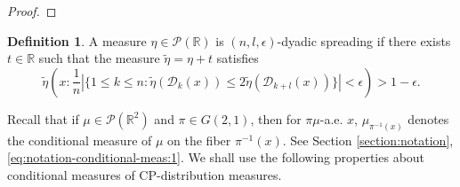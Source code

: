 \documentclass[a4paper,11pt]{amsart}
\theoremstyle{definition}
\newtheorem{definition}[theorem]{Definition}
\numberwithin{equation}{section}
\def\D{\mathcal{D}}
\def\cP{\mathcal P}
\def\R{\mathbb R}
\begin{document}
\begin{proof}
\end{proof}



\begin{definition}\label{definition:spreading measures}
A measure $\eta\in \cP(\R)$ is $(n,l,\epsilon)$-dyadic spreading if  there exists $t\in \R$ such that the measure $\tilde{\eta}=\eta+t$ satisfies
\[
\tilde{\eta}\left(x: \frac{1}{n}| \{1\le k\le n: \tilde{\eta}(\D_k(x))\le 2 \tilde{\eta}(\D_{k+l}(x))\} |<\epsilon\right) >1-\epsilon.
\]
\end{definition}


Recall that if   $\mu\in \cP(\R^2)$ and $\pi\in G(2,1)$, then for $\pi\mu$-a.e.  $x$,  $\mu_{\pi^{-1}(x)}$ denotes the conditional measure of $\mu$ on the fiber $\pi^{-1}(x)$.  See Section \ref{section:notation},    \eqref{eq:notation-conditional-meas:1}.  
We shall use the following properties about conditional measures of CP-distribution measures.
\end{document}
